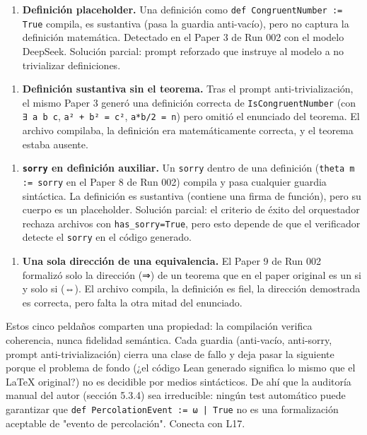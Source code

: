 \documentclass[12pt,a4paper]{article}
\theoremstyle{remark}
\begin{document}
\begin{enumerate}
\item \textbf{Definición placeholder.} Una definición como \texttt{def CongruentNumber := True} compila, es sustantiva (pasa la guardia anti-vacío), pero no captura la definición matemática. Detectado en el Paper 3 de Run 002 con el modelo DeepSeek. Solución parcial: prompt reforzado que instruye al modelo a no trivializar definiciones.
\end{enumerate}

\begin{enumerate}
\item \textbf{Definición sustantiva sin el teorema.} Tras el prompt anti-trivialización, el mismo Paper 3 generó una definición correcta de \texttt{IsCongruentNumber} (con \texttt{∃ a b c}, \texttt{a² + b² = c²}, \texttt{a*b/2 = n}) pero omitió el enunciado del teorema. El archivo compilaba, la definición era matemáticamente correcta, y el teorema estaba ausente.
\end{enumerate}

\begin{enumerate}
\item \textbf{\texttt{sorry} en definición auxiliar.} Un \texttt{sorry} dentro de una definición (\texttt{theta m := sorry} en el Paper 8 de Run 002) compila y pasa cualquier guardia sintáctica. La definición es sustantiva (contiene una firma de función), pero su cuerpo es un placeholder. Solución parcial: el criterio de éxito del orquestador rechaza archivos con \texttt{has\_sorry=True}, pero esto depende de que el verificador detecte el \texttt{sorry} en el código generado.
\end{enumerate}

\begin{enumerate}
\item \textbf{Una sola dirección de una equivalencia.} El Paper 9 de Run 002 formalizó solo la dirección (⇒) de un teorema que en el paper original es un si y solo si (⇔). El archivo compila, la definición es fiel, la dirección demostrada es correcta, pero falta la otra mitad del enunciado.
\end{enumerate}


Estos cinco peldaños comparten una propiedad: la compilación verifica coherencia, nunca fidelidad semántica. Cada guardia (anti-vacío, anti-sorry, prompt anti-trivialización) cierra una clase de fallo y deja pasar la siguiente porque el problema de fondo (¿el código Lean generado significa lo mismo que el LaTeX original?) no es decidible por medios sintácticos. De ahí que la auditoría manual del autor (sección 5.3.4) sea irreducible: ningún test automático puede garantizar que \texttt{def PercolationEvent := {ω | True}} no es una formalización aceptable de "evento de percolación". Conecta con L17.
\end{document}
